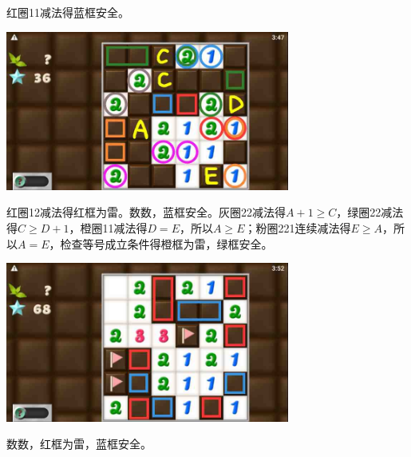 红圈11减法得蓝框安全。
\begin{center}
    \includegraphics[width=0.7\textwidth]{puzzlelow/242-4.jpg}
\end{center}
红圈12减法得红框为雷。数数，蓝框安全。灰圈22减法得$A+1\ge C$，绿圈22减法得$C\ge D+1$，橙圈11减法得$D=E$，所以$A\ge E$；粉圈221连续减法得$E\ge A$，所以$A=E$，检查等号成立条件得橙框为雷，绿框安全。
\begin{center}
    \includegraphics[width=0.7\textwidth]{puzzlelow/242-5.jpg}
\end{center}
数数，红框为雷，蓝框安全。

